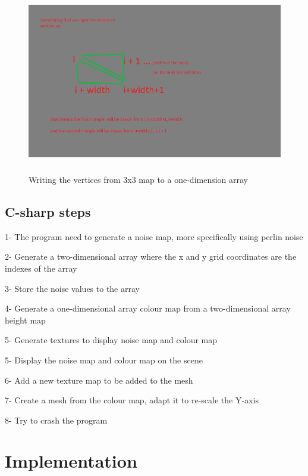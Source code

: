 \documentclass[a4paper,12pt]{book}
\begin{document}
\begin{figure}
\begin{center}
\includegraphics[height=80mm]{mesh_research_7.png}
\end{center}
\caption{Writing the vertices from 3x3 map to a one-dimension array}
\label{fig:pretty}
\end{figure}



\section{C-sharp steps}

1- The program need to generate a noise map, more specifically using perlin noise

2- Generate a two-dimensional array where the x and y grid coordinates are the indexes of the array

3- Store the noise values to the array

4- Generate a one-dimensional array colour map from a two-dimensional array height map

5- Generate textures to display noise map and colour map

5- Display the noise map and colour map on the scene

6- Add a new texture map to be added to the mesh

7- Create a mesh from the colour map, adapt it to re-scale the Y-axis

8-  Try to crash the program


\chapter{Implementation}
\label{chap:implementation}
\end{document}
